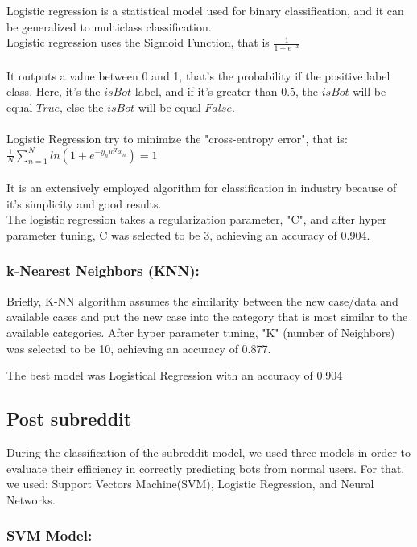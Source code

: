 \documentclass{article}
\begin{document}
    Logistic regression is a statistical model used for binary classification, and it can be generalized to multiclass classification. \\
Logistic regression uses the Sigmoid Function, that is $\frac{1}{1+e^{-x}}$\\ \\ It outputs a value between 0 and 1, that's the probability if the positive label class. Here, it's the $isBot$ label, and if it's greater than 0.5, the $isBot$ will be equal $True$, else the $isBot$ will be equal $False$.  \\ \\
Logistic Regression try to minimize the "cross-entropy error", that is:\\ $\frac{1}{N} \sum_{n=1}^{N} ln(1 + e^ {-y_{n}w^Tx_n}) = 1$\\ \\
It is an extensively employed algorithm for classification in industry because of it's simplicity and good results. \\
The logistic regression takes a regularization parameter, "C", and after hyper parameter tuning, C was selected to be 3, achieving an accuracy of 0.904. 

 \subsubsection{k-Nearest Neighbors (KNN):}   
Briefly, K-NN algorithm assumes the similarity between the new case/data and available cases and put the new case into the category that is most similar to the available categories.
After hyper parameter tuning, "K" (number of Neighbors) was selected to be 10, achieving an accuracy of 0.877. 

        The best model was Logistical Regression with an accuracy of 0.904

    \subsection{Post subreddit}  
    
    
    During the classification of  the subreddit model, we used three models in order to evaluate their efficiency in correctly predicting bots from normal users. For that, we used: Support Vectors Machine(SVM), Logistic Regression, and Neural Networks.
    
    \subsubsection{SVM Model:}
    
\end{document}
